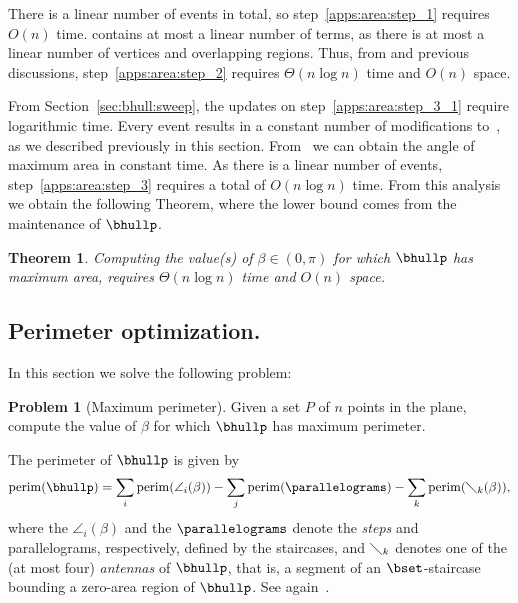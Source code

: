\documentclass[11pt,letterpaper,english]{article}
\newtheorem{theorem}{Theorem}
\theoremstyle{definition}
\newtheorem{problem}{Problem}
\newcommand{\perim}{\operatorname{perim}}
\begin{document}
There is a linear number of events in total, so
step~\ref{apps:area:step_1} requires $O(n)$
time.  contains at most a linear number of terms, as
there is at most a linear number of vertices and overlapping
regions. Thus, from  and previous
discussions, step~\ref{apps:area:step_2} requires $\Theta(n \log n)$ time
and $O(n)$ space.

From Section~\ref{sec:bhull:sweep}, the updates on step~\ref{apps:area:step_3_1}
require logarithmic time. Every event results in a constant number of modifications
to~, as we described previously in this
section. From~ we can obtain the angle of
maximum area in constant time. As there is a linear number of events,
step~\ref{apps:area:step_3} requires a total of $O(n\log n)$ time. From
this analysis we obtain the following Theorem, where the lower bound comes
from the maintenance of $\bhullp$.

\begin{theorem}
  Computing the value(s) of $\beta \in (0, \pi)$ for which $\bhullp$
  has maximum area, requires $\Theta(n \log n)$ time and $O(n)$ space.
\end{theorem}

\subsection{Perimeter optimization.}\label{sec:apps:perimeter}

In this section we solve the following problem:

\begin{problem}[Maximum perimeter]
  Given a set $P$ of $n$ points in the plane, compute the value of
  $\beta$ for which $\bhullp$ has maximum perimeter.
\end{problem}

\noindent The perimeter of $\bhullp$ is given by
\begin{equation}
  \label{apps:perim:eqn:perim}
  \perim(\bhullp) = \sum_i \perim(\angle_i(\beta))
  - \sum_j \perim(\parallelograms)
  - \sum_k \perim(\diagdown_k(\beta)),
\end{equation}
where the $\angle_i(\beta)$ and the $\parallelograms$ denote the \emph{steps}
 and parallelograms, respectively, defined
by the staircases, and $\diagdown_k$ denotes one of the (at most four)
\emph{antennas} of $\bhullp$, that is, a segment of an
$\bset$-staircase bounding a zero-area region of $\bhullp$.
See again~.
\end{document}
